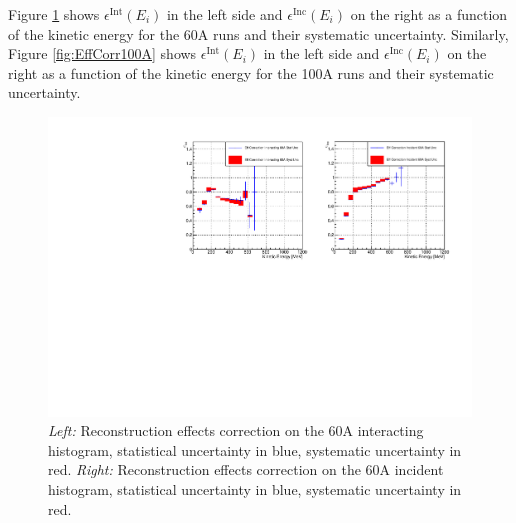 Figure \ref{fig:EffCorr60A} shows $\epsilon^{\text{Int}}(E_{i})$ in the left side and $ \epsilon^{\text{Inc}}(E_i)$ on the right as a function of the kinetic energy for the 60A runs and their systematic uncertainty. Similarly, Figure \ref{fig:EffCorr100A} shows $\epsilon^{\text{Int}}(E_{i})$ in the left side and $ \epsilon^{\text{Inc}}(E_i)$ on the right as a function of the kinetic energy for the 100A runs and their systematic uncertainty. 

\begin{figure}[p]
\centering
\includegraphics[width=\textwidth]{Chapter-6/Images/60AEffCorr.pdf}
\caption{\emph{Left:} Reconstruction effects correction on the 60A interacting histogram, statistical uncertainty in blue, systematic uncertainty in red. \emph{Right:}  Reconstruction effects correction on the 60A incident histogram, statistical uncertainty in blue, systematic uncertainty in red.}
\label{fig:EffCorr60A}
\end{figure}

